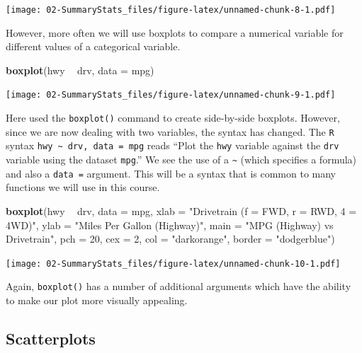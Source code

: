 \documentclass[]{book}
\newenvironment{Shaded}{\begin{snugshade}}{\end{snugshade}}
\newcommand{\KeywordTok}[1]{\textcolor[rgb]{0.13,0.29,0.53}{\textbf{#1}}}
\newcommand{\DataTypeTok}[1]{\textcolor[rgb]{0.13,0.29,0.53}{#1}}
\newcommand{\DecValTok}[1]{\textcolor[rgb]{0.00,0.00,0.81}{#1}}
\newcommand{\StringTok}[1]{\textcolor[rgb]{0.31,0.60,0.02}{#1}}
\newcommand{\OperatorTok}[1]{\textcolor[rgb]{0.81,0.36,0.00}{\textbf{#1}}}
\newcommand{\NormalTok}[1]{#1}
\begin{document}
\texttt{[image: 02-SummaryStats\_files/figure-latex/unnamed-chunk-8-1.pdf]}

However, more often we will use boxplots to compare a numerical variable
for different values of a categorical variable.

\begin{Shaded}
\begin{Highlighting}[]
\KeywordTok{boxplot}\NormalTok{(hwy }\OperatorTok{~}\StringTok{ }\NormalTok{drv, }\DataTypeTok{data =}\NormalTok{ mpg)}
\end{Highlighting}
\end{Shaded}

\texttt{[image: 02-SummaryStats\_files/figure-latex/unnamed-chunk-9-1.pdf]}

Here used the \texttt{boxplot()} command to create side-by-side
boxplots. However, since we are now dealing with two variables, the
syntax has changed. The \texttt{R} syntax
\texttt{hwy\ \textasciitilde{}\ drv,\ data\ =\ mpg} reads ``Plot the
\texttt{hwy} variable against the \texttt{drv} variable using the
dataset \texttt{mpg}.'' We see the use of a \texttt{\textasciitilde{}}
(which specifies a formula) and also a \texttt{data\ =} argument. This
will be a syntax that is common to many functions we will use in this
course.

\begin{Shaded}
\begin{Highlighting}[]
\KeywordTok{boxplot}\NormalTok{(hwy }\OperatorTok{~}\StringTok{ }\NormalTok{drv, }\DataTypeTok{data =}\NormalTok{ mpg,}
     \DataTypeTok{xlab   =} \StringTok{"Drivetrain (f = FWD, r = RWD, 4 = 4WD)"}\NormalTok{,}
     \DataTypeTok{ylab   =} \StringTok{"Miles Per Gallon (Highway)"}\NormalTok{,}
     \DataTypeTok{main   =} \StringTok{"MPG (Highway) vs Drivetrain"}\NormalTok{,}
     \DataTypeTok{pch    =} \DecValTok{20}\NormalTok{,}
     \DataTypeTok{cex    =} \DecValTok{2}\NormalTok{,}
     \DataTypeTok{col    =} \StringTok{"darkorange"}\NormalTok{,}
     \DataTypeTok{border =} \StringTok{"dodgerblue"}\NormalTok{)}
\end{Highlighting}
\end{Shaded}

\texttt{[image: 02-SummaryStats\_files/figure-latex/unnamed-chunk-10-1.pdf]}

Again, \texttt{boxplot()} has a number of additional arguments which
have the ability to make our plot more visually appealing.

\subsection{Scatterplots}\label{scatterplots}
\end{document}
